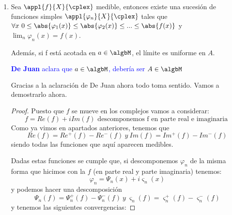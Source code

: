 \documentclass{apuntes}
\begin{document}
\begin{enumerate}
\begin{enumerate}
Además, si f está acotada en $A \in \algbM$, $\varphi_n$ converge uniformemente a $f$ en $A$.

\begin{proof}
Vamos a construir el término general de la sucesión de funciones simples ($\varphi_n$) necesaria para este aparado.

\[\forall n \in \nat \ \forall k \in \nat, \ 0 \leq k \leq 2^{2n}-1\]
Definimos
\[E_n^k = f^{-1}((k2^{-n}, (k+1)2^{-n}])\]
y
\[F_n = f^{-1}((2^n, \infty ])\]

Y definimos ahora
\[\varphi_n(x)= \sum_{k=0}^{2^{2n}-1}\left(k2^{-n}\ind_{E_n^k}(x)\right)+2^n \ind_{F_n}\]
Con esta construcción vemos obviamente que $\varphi_n(x) \leq \varphi_{n-+1}(x)$. Además tenemos:
\[\forall x \ \lim_n \varphi_n(x)=f(x)\]

Nos queda ver la última parte del enunciado, que si f está acotada en $A \in \algbM$, $\varphi_n$ converge uniformemente a $f$ en $A$.

Si f está acotada tenemos que $\exists n \ \forall x \in A \ |f(x)|<2^n$. Entonces
\[\forall x \in A, \ \forall m \geq n \ f(x)-f_n(x) < \frac{1}{n}\]
es decir, converge uniformemente en $A$
\end{proof}

\item Sea $\appl{f}{X}{\cplex}$ medible, entonces existe una sucesión de funciones simples $\appl{\varphi_n}{X}{\cplex}$ tales que $\forall x \ 0 \leq \abs{\varphi_1(x)} \leq \abs{\varphi_2(x)} \leq ... \leq \abs{f(x)}$ y $\lim_n \varphi_n(x)=f(x)$.

Además, si f está acotada en $a \in \algbM$, el límite es uniforme en $A$.

\textcolor{blue}{\textbf{De Juan} aclara que $a \in \algbM$, debería ser $A \in \algbM$}

Gracias a la aclaración de De Juan ahora todo toma sentido. Vamos a demostrarlo ahora.
\begin{proof}
Puesto que $f$ se mueve en los complejos vamos a considerar:
\[f=Re(f)+i Im(f) \text{ descomponemos f en parte real e imaginaria }\]
Como ya vimos en apartados anteriores, tenemos que
\[Re(f)=Re^+(f)-Re^-(f) \ y \ Im(f)=Im^+(f)-Im^-(f)\]
siendo todas las funciones que aquí aparecen medibles.

Dadas estas funciones se cumple que, si descomponemos $\varphi_n$ de la misma forma que hicimos con la $f$ (en parte real y parte imaginaria) tenemos:
\[\varphi_n = \Psi_n(x)+i\varsigma_n(x)\]
y podemos hacer una descomposición
\[\Psi_n(f)=\Psi_n^+(f)-\Psi_n^-(f) \ y \ \varsigma_n(f)=\varsigma_n^+(f)-\varsigma_n^-(f)\]
y tenemos las siguientes convergencias:


\end{proof}
\end{enumerate}
\end{enumerate}
\end{document}
